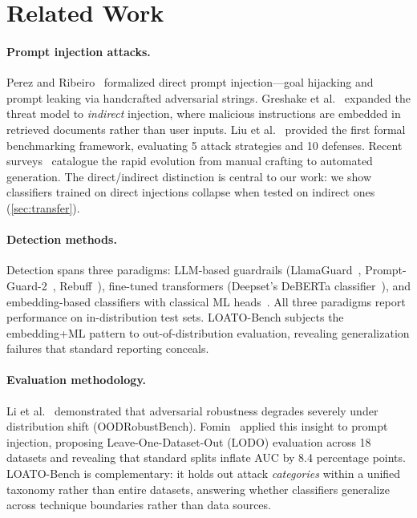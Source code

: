 \documentclass[11pt,a4paper]{article}
\begin{document}
\section{Related Work}
\label{sec:related}

\paragraph{Prompt injection attacks.}
Perez and Ribeiro~\citeyearpar{perez2022ignore} formalized direct prompt
injection---goal hijacking and prompt leaking via handcrafted adversarial
strings. Greshake et al.~\citeyearpar{greshake2023not} expanded the threat model
to \emph{indirect} injection, where malicious instructions are embedded in
retrieved documents rather than user inputs. Liu et
al.~\citeyearpar{liu2024formalizing} provided the first formal benchmarking
framework, evaluating 5 attack strategies and 10 defenses. Recent
surveys~\citep{esmradi2025comprehensive} catalogue the rapid evolution from
manual crafting to automated generation. The direct/indirect distinction is
central to our work: we show classifiers trained on direct injections collapse
when tested on indirect ones (\cref{sec:transfer}).

\paragraph{Detection methods.}
Detection spans three paradigms: LLM-based guardrails
(LlamaGuard~\citep{inan2023llamaguard},
Prompt-Guard-2~\citep{meta2024promptguard},
Rebuff~\citep{protectai2023rebuff}), fine-tuned transformers
(Deepset's DeBERTa classifier~\citep{deepset2023promptinjections}), and
embedding-based classifiers with classical ML
heads~\citep{ayub2024embedding}. All three paradigms report performance on
in-distribution test sets. LOATO-Bench subjects the embedding+ML pattern to
out-of-distribution evaluation, revealing generalization failures that standard
reporting conceals.

\paragraph{Evaluation methodology.}
Li et al.~\citeyearpar{li2024oodrobustbench} demonstrated that adversarial
robustness degrades severely under distribution shift (OODRobustBench).
Fomin~\citeyearpar{fomin2026benchmarks} applied this insight to prompt
injection, proposing Leave-One-Dataset-Out (LODO) evaluation across 18 datasets
and revealing that standard splits inflate AUC by 8.4 percentage points.
LOATO-Bench is complementary: it holds out attack \emph{categories} within a
unified taxonomy rather than entire datasets, answering whether classifiers
generalize across technique boundaries rather than data sources.
\end{document}

